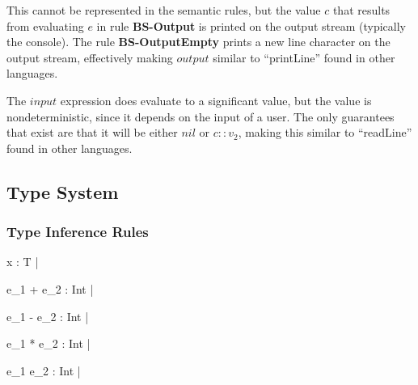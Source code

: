 \documentclass{article}
\begin{document}
This cannot be represented in the semantic rules, but the value $c$ that results from evaluating $e$ in rule \textbf{BS-Output} is printed on the output stream (typically the console).
The rule \textbf{BS-OutputEmpty} prints a new line character on the output stream, effectively making $output$ similar to "`printLine"' found in other languages.

The $input$ expression does evaluate to a significant value, but the value is nondeterministic, since it depends on the input of a user.
The only guarantees that exist are that it will be either $nil$ or $c :: v_2$, making this similar to "`readLine"' found in other languages.


\subsection{Type System}\label{Type System}
	
\subsubsection{Type Inference Rules}

	
	
	
	
	{\Gamma \vdash x : \mbox{T} \; | \; \left[\right]}
	
\bigskip
	
	{\Gamma \vdash e_1 + e_2 : \mbox{Int} \; | \; \left[T_1 = \mbox{Int}; T_2 = \mbox{Int}\right]}
	
	{\Gamma \vdash e_1 - e_2 : \mbox{Int} \; | \; \left[T_1 = \mbox{Int}; T_2 = \mbox{Int}\right]}
	
	{\Gamma \vdash e_1 * e_2 : \mbox{Int} \; | \; \left[T_1 = \mbox{Int}; T_2 = \mbox{Int}\right]}
	
	{\Gamma \vdash e_1 \div e_2 : \mbox{Int} \; | \; \left[T_1 = \mbox{Int}; T_2 = \mbox{Int}\right]}
\end{document}

